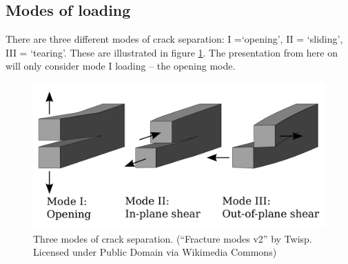 \subsection{Modes of loading}
There are three different modes of crack separation: I =`opening', II = `sliding', III = `tearing'. These are illustrated in figure \ref{fig:loading_modes}. The presentation from here on will only consider mode I loading -- the opening mode.

\begin{figure}
\includegraphics[width=\textwidth]{../figures/thesis/Fracture_modes_v2.pdf}
\caption{Three modes of crack separation. (``Fracture modes v2'' by Twisp. Licensed under Public Domain via Wikimedia Commons)}
\label{fig:loading_modes}
\end{figure}

